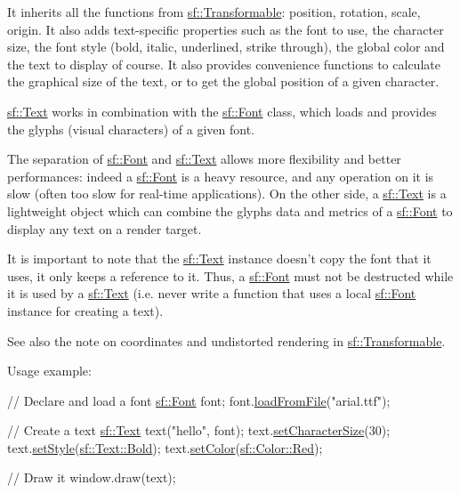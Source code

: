 It inherits all the functions from \hyperlink{classsf_1_1_transformable}{sf\-::\-Transformable}\-: position, rotation, scale, origin. It also adds text-\/specific properties such as the font to use, the character size, the font style (bold, italic, underlined, strike through), the global color and the text to display of course. It also provides convenience functions to calculate the graphical size of the text, or to get the global position of a given character.

\hyperlink{classsf_1_1_text}{sf\-::\-Text} works in combination with the \hyperlink{classsf_1_1_font}{sf\-::\-Font} class, which loads and provides the glyphs (visual characters) of a given font.

The separation of \hyperlink{classsf_1_1_font}{sf\-::\-Font} and \hyperlink{classsf_1_1_text}{sf\-::\-Text} allows more flexibility and better performances\-: indeed a \hyperlink{classsf_1_1_font}{sf\-::\-Font} is a heavy resource, and any operation on it is slow (often too slow for real-\/time applications). On the other side, a \hyperlink{classsf_1_1_text}{sf\-::\-Text} is a lightweight object which can combine the glyphs data and metrics of a \hyperlink{classsf_1_1_font}{sf\-::\-Font} to display any text on a render target.

It is important to note that the \hyperlink{classsf_1_1_text}{sf\-::\-Text} instance doesn't copy the font that it uses, it only keeps a reference to it. Thus, a \hyperlink{classsf_1_1_font}{sf\-::\-Font} must not be destructed while it is used by a \hyperlink{classsf_1_1_text}{sf\-::\-Text} (i.\-e. never write a function that uses a local \hyperlink{classsf_1_1_font}{sf\-::\-Font} instance for creating a text).

See also the note on coordinates and undistorted rendering in \hyperlink{classsf_1_1_transformable}{sf\-::\-Transformable}.

Usage example\-: 
\begin{DoxyCode}
\textcolor{comment}{// Declare and load a font}
\hyperlink{classsf_1_1_font}{sf::Font} font;
font.\hyperlink{classsf_1_1_font_ab020052ef4e01f6c749a85571c0f3fd1}{loadFromFile}(\textcolor{stringliteral}{"arial.ttf"});

\textcolor{comment}{// Create a text}
\hyperlink{classsf_1_1_text}{sf::Text} text(\textcolor{stringliteral}{"hello"}, font);
text.\hyperlink{classsf_1_1_text_ae96f835fc1bff858f8a23c5b01eaaf7e}{setCharacterSize}(30);
text.\hyperlink{classsf_1_1_text_ad791702bc2d1b6590a1719aa60635edf}{setStyle}(\hyperlink{classsf_1_1_text_aa8add4aef484c6e6b20faff07452bd82a140bf2d7252e8ec458eca939783c0c5c}{sf::Text::Bold});
text.\hyperlink{classsf_1_1_text_afd1742fca1adb6b0ea98357250ffb634}{setColor}(\hyperlink{classsf_1_1_color_a7052b1c5408a953e25f9691e0e828c9d}{sf::Color::Red});

\textcolor{comment}{// Draw it}
window.draw(text);
\end{DoxyCode}


